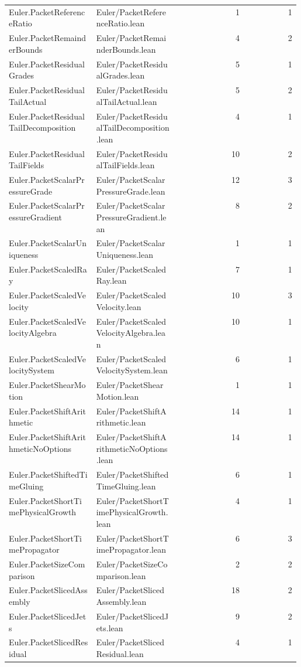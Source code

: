 \begin{longtable}{p{0.30\linewidth}p{0.28\linewidth}rr}
Euler.PacketReferenceRatio & Euler/PacketReferenceRatio.lean & 1 & 1\\
Euler.PacketRemainderBounds & Euler/PacketRemainderBounds.lean & 4 & 2\\
Euler.PacketResidualGrades & Euler/PacketResidualGrades.lean & 5 & 1\\
Euler.PacketResidualTailActual & Euler/PacketResidualTailActual.lean & 5 & 2\\
Euler.PacketResidualTailDecomposition & Euler/PacketResidualTailDecomposition.lean & 4 & 1\\
Euler.PacketResidualTailFields & Euler/PacketResidualTailFields.lean & 10 & 2\\
Euler.PacketScalarPressureGrade & Euler/PacketScalarPressureGrade.lean & 12 & 3\\
Euler.PacketScalarPressureGradient & Euler/PacketScalarPressureGradient.lean & 8 & 2\\
Euler.PacketScalarUniqueness & Euler/PacketScalarUniqueness.lean & 1 & 1\\
Euler.PacketScaledRay & Euler/PacketScaledRay.lean & 7 & 1\\
Euler.PacketScaledVelocity & Euler/PacketScaledVelocity.lean & 10 & 3\\
Euler.PacketScaledVelocityAlgebra & Euler/PacketScaledVelocityAlgebra.lean & 10 & 1\\
Euler.PacketScaledVelocitySystem & Euler/PacketScaledVelocitySystem.lean & 6 & 1\\
Euler.PacketShearMotion & Euler/PacketShearMotion.lean & 1 & 1\\
Euler.PacketShiftArithmetic & Euler/PacketShiftArithmetic.lean & 14 & 1\\
Euler.PacketShiftArithmeticNoOptions & Euler/PacketShiftArithmeticNoOptions.lean & 14 & 1\\
Euler.PacketShiftedTimeGluing & Euler/PacketShiftedTimeGluing.lean & 6 & 1\\
Euler.PacketShortTimePhysicalGrowth & Euler/PacketShortTimePhysicalGrowth.lean & 4 & 1\\
Euler.PacketShortTimePropagator & Euler/PacketShortTimePropagator.lean & 6 & 3\\
Euler.PacketSizeComparison & Euler/PacketSizeComparison.lean & 2 & 2\\
Euler.PacketSlicedAssembly & Euler/PacketSlicedAssembly.lean & 18 & 2\\
Euler.PacketSlicedJets & Euler/PacketSlicedJets.lean & 9 & 2\\
Euler.PacketSlicedResidual & Euler/PacketSlicedResidual.lean & 4 & 1\\

\end{longtable}

